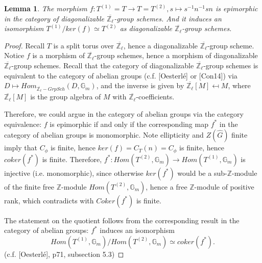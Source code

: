 \documentclass{article}
\newtheorem{lemma}{Lemma}
\begin{document}
	\begin{lemma}
		The morphism
		$f: T^{(1)}=T \to T=T^{(2)}, s \mapsto s^{-1}n^{-1}sn$
		is epimorphic in the category of diagonalizable $\overline{\mathbb{Z}_{\ell}}$-group schemes. And it induces an isomorphism $T^{(1)}/ker(f) \simeq T^{(2)}$ as diagonalizable $\overline{\mathbb{Z}_{\ell}}$-group schemes.
	\end{lemma}
	
	\begin{proof}
		Recall $T$ is a split torus over $\overline{\mathbb{Z}_{\ell}}$, hence a diagonalizable $\overline{\mathbb{Z}_{\ell}}$-group scheme. Notice $f$ is a morphism of $\overline{\mathbb{Z}_{\ell}}$-group schemes, hence a morphism of diagonalizable $\overline{\mathbb{Z}_{\ell}}$-group schemes. Recall that the category of diagonalizable $\overline{\mathbb{Z}_{\ell}}$-group schemes is equivalent to the category of abelian groups (c.f. [Oesterlé] or [Con14]) via $D \mapsto Hom_{\overline{\mathbb{Z}_{\ell}}-Grp Sch}(D, \mathbb{G}_m)$, and the inverse is given by $\overline{\mathbb{Z}_{\ell}}[M] \mapsfrom M$, where $\overline{\mathbb{Z}_{\ell}}[M]$ is the group algebra of $M$ with $\overline{\mathbb{Z}_{\ell}}$-coefficients. 
		
		Therefore, we could argue in the category of abelian groups via the category equivalence: $f$ is epimorphic if and only if the corresponding map $f^*$ in the category of abelian groups is monomorphic. Note ellipticity and $Z(\hat{G})$ finite imply that $C_{\phi}$ is finite, hence $ker(f)=C_T(n)=C_{\phi}$ is finite, hence $coker(f^*)$ is finite. Therefore, $f^*: Hom(T^{(2)}, \mathbb{G}_m) \to Hom(T^{(1)}, \mathbb{G}_m)$ is injective (i.e. monomorphic), since otherwise $ker(f^*)$ would be a sub-$\mathbb{Z}$-module of the finite free $\mathbb{Z}$-module $Hom(T^{(2)}, \mathbb{G}_m)$, hence a free $\mathbb{Z}$-module of positive rank, which contradicts with $Coker(f^*)$ is finite.
		
		The statement on the quotient follows from the corresponding result in the category of abelian groups: $f^*$ induces an isomorphism 
		$$Hom(T^{(1)}, \mathbb{G}_m)/Hom(T^{(2)}, \mathbb{G}_m) \simeq coker(f^*).$$ (c.f. [Oesterlé], p71, subsection 5.3)
		
		

\end{proof}
\end{document}
